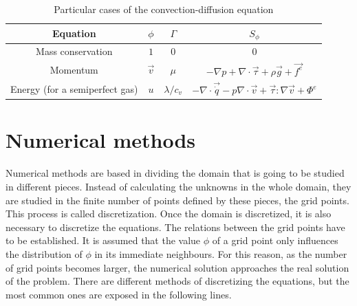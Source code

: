 \begin{table}[h!]
	\centering
	\begin{tabular}{ |c|c|c|c| } 
		\hline
		Equation & $\phi$ & $\Gamma$ & $S_{\phi}$ \\ \hline 
		Mass conservation & $1$ & $0$ & $0$ \\  \hline
		Momentum & $\vec{v}$ & $\mu$ & $-\nabla p+\nabla\cdot\vec{\tau}+\rho\vec{g}+\vec{f^{e}}$ \\  \hline
		Energy (for a semiperfect gas) & $u$ & $\lambda/c_{v}$ & $-\nabla\cdot\vec{\dot{q}}-p\nabla\cdot\vec{v}+\vec{\tau}:\nabla\vec{v}+\Phi^{e}$ \\
		\hline
	\end{tabular}
\caption{Particular cases of the convection-diffusion equation}
\label{convdifeq}
\end{table}

\section{Numerical methods}
Numerical methods are based in dividing the domain that is going to be studied in different pieces. Instead of calculating the unknowns in the whole domain, they are studied in the finite number of points defined by these pieces, the grid points. This process is called discretization.
Once the domain is discretized, it is also necessary to discretize the equations. The relations between the grid points have to be established. It is assumed that the value $\phi$ of a grid point only influences the distribution of $\phi$ in its immediate neighbours. For this reason, as the number of grid points becomes larger, the numerical solution approaches the real solution of the problem.
There are different methods of discretizing the equations, but the most common ones are exposed in the following lines.

